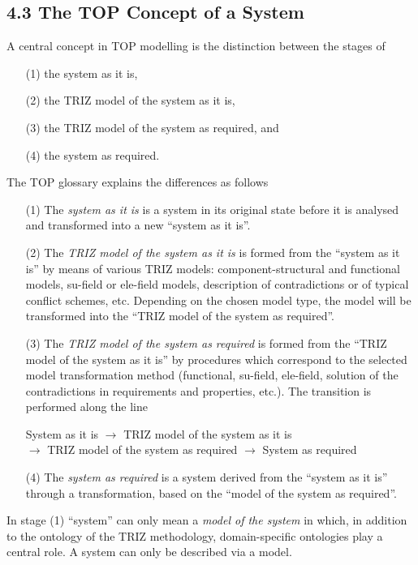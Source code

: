 \documentclass[12pt,a4paper]{article}
\begin{document}
\subsection*{4.3 The TOP Concept of a System}

A central concept in TOP modelling is the distinction between the stages of
\begin{itemize}
\item[(1)] the system as it is,
\item[(2)] the TRIZ model of the system as it is,
\item[(3)] the TRIZ model of the system as required, and
\item[(4)] the system as required.
\end{itemize}
The TOP glossary \cite{23} explains the differences as follows
\begin{itemize}
\item[(1)] The \emph{system as it is} is a system in its original state before
  it is analysed and transformed into a new “system as it is”.
\item[(2)] The \emph{TRIZ model of the system as it is} is formed from the
  “system as it is” by means of various TRIZ models: component-structural and
  functional models, su-field or ele-field models, description of
  contradictions or of typical conflict schemes, etc. Depending on the chosen
  model type, the model will be transformed into the “TRIZ model of the system
  as required”.
\item[(3)] The \emph{TRIZ model of the system as required} is formed from the
  “TRIZ model of the system as it is” by procedures which correspond to the
  selected model transformation method (functional, su-field, ele-field,
  solution of the contradictions in requirements and properties, etc.). The
  transition is performed along the line 
  \begin{center}
    System as it is $\to$ TRIZ model of the system as it is\\ $\to$ TRIZ model
    of the system as required $\to$ System as required
  \end{center}
\item[(4)] The \emph{system as required} is a system derived from the “system
  as it is” through a transformation, based on the “model of the system as
  required”.
\end{itemize}

In stage (1) “system” can only mean a \emph{model of the system} in which, in
addition to the ontology of the TRIZ methodology, domain-specific ontologies
play a central role. A system can only be described via a model.
\end{document}
